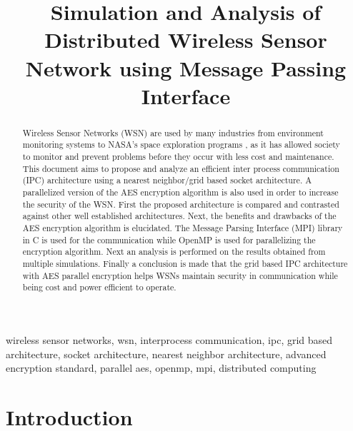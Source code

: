 \documentclass[conference]{IEEEtran}
\begin{document}
	
	\title{Simulation and Analysis of Distributed Wireless Sensor Network using Message Passing Interface }
	
	\author{
		}
	\maketitle
	
	\begin{abstract}
		Wireless Sensor Networks (WSN) are used by many industries from environment monitoring systems \cite{othman2012wireless} to NASA's space exploration programs \cite{barton2015space}, as it has allowed society to monitor and prevent problems before they occur with less cost and maintenance. This document aims to propose and analyze an efficient inter process communication (IPC) architecture using a nearest neighbor/grid based socket architecture. A parallelized version of the AES encryption algorithm is also used in order to increase the security of the WSN. First the proposed architecture is compared and contrasted against other well established architectures. Next, the benefits and drawbacks of the AES encryption algorithm is elucidated. The Message Parsing Interface (MPI) library in C \cite{openmpi} is used for the communication while OpenMP \cite{openmp_2018} is used for parallelizing the encryption algorithm. Next an analysis is performed on the results obtained from multiple simulations. Finally a conclusion is made that the grid based IPC architecture with AES parallel encryption helps WSNs maintain security in communication while being cost and power efficient to operate.

	\end{abstract}

	
	\begin{IEEEkeywords}
	wireless sensor networks, wsn, interprocess communication, ipc, grid based architecture, socket architecture, nearest neighbor architecture, advanced encryption standard, parallel aes, openmp, mpi, distributed computing
	\end{IEEEkeywords}
	
	\section{Introduction} \label{intro}
	
\end{document}
